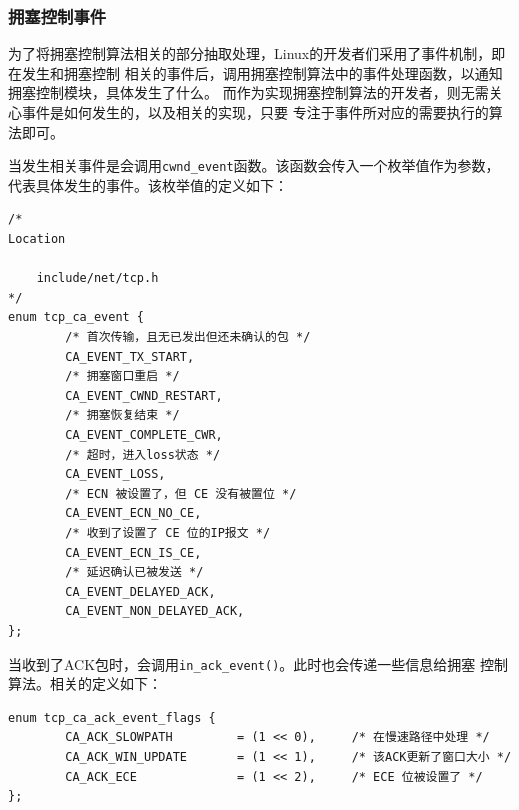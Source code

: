 		\subsubsection{拥塞控制事件}
			为了将拥塞控制算法相关的部分抽取处理，Linux的开发者们采用了事件机制，即在发生和拥塞控制
			相关的事件后，调用拥塞控制算法中的事件处理函数，以通知拥塞控制模块，具体发生了什么。
			而作为实现拥塞控制算法的开发者，则无需关心事件是如何发生的，以及相关的实现，只要
			专注于事件所对应的需要执行的算法即可。

			当发生相关事件是会调用\texttt{cwnd_event}函数。该函数会传入一个枚举值作为参数，
			代表具体发生的事件。该枚举值的定义如下：
\begin{verbatim}
/*
Location

	include/net/tcp.h
*/
enum tcp_ca_event {
        /* 首次传输，且无已发出但还未确认的包 */
        CA_EVENT_TX_START,
        /* 拥塞窗口重启 */
        CA_EVENT_CWND_RESTART,  
        /* 拥塞恢复结束 */
        CA_EVENT_COMPLETE_CWR,
        /* 超时，进入loss状态 */
        CA_EVENT_LOSS,          
        /* ECN 被设置了，但 CE 没有被置位 */
        CA_EVENT_ECN_NO_CE,     
        /* 收到了设置了 CE 位的IP报文 */
        CA_EVENT_ECN_IS_CE,     
        /* 延迟确认已被发送 */
        CA_EVENT_DELAYED_ACK,
        CA_EVENT_NON_DELAYED_ACK,
};
\end{verbatim}

当收到了ACK包时，会调用\texttt{in_ack_event()}。此时也会传递一些信息给拥塞
控制算法。相关的定义如下：
\begin{verbatim}
enum tcp_ca_ack_event_flags {
        CA_ACK_SLOWPATH         = (1 << 0),     /* 在慢速路径中处理 */
        CA_ACK_WIN_UPDATE       = (1 << 1),     /* 该ACK更新了窗口大小 */
        CA_ACK_ECE              = (1 << 2),     /* ECE 位被设置了 */
};
\end{verbatim}


